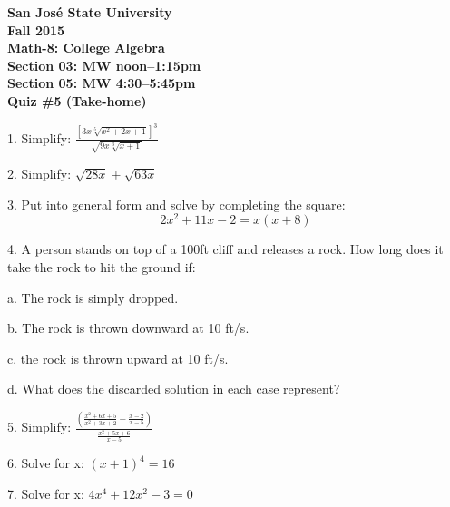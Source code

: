 \documentclass[letterpaper, 12pt]{article}
\begin{document}
\begin{center}
\bfseries
San Jos\'{e} State University \\
Fall 2015 \\
Math-8: College Algebra \\
Section 03: MW noon--1:15pm \\
Section 05: MW 4:30--5:45pm \\
\bigskip
Quiz \#5 (Take-home)
\end{center}

\bigskip

1. Simplify:
    $\frac{\left[3x\sqrt[5]{x^2+2x+1}\right]^3}{\sqrt{9x\sqrt[3]{x+1}}}$

\bigskip

2. Simplify: $\sqrt{28x}+\sqrt{63x}$

\bigskip

3. Put into general form and solve by completing the square:
\[2x^2+11x-2=x(x+8)\]

4. A person stands on top of a 100ft cliff and releases a rock.  How long does
it take the rock to hit the ground if:

\begin{description}
\item{a.} The rock is simply dropped.
\item{b.} The rock is thrown downward at 10 ft/s.
\item{c.} the rock is thrown upward at 10 ft/s.
\item{d.} What does the discarded solution in each case represent?
\end{description}

5. Simplify: $\frac{\left(\frac{x^2+6x+5}{x^2+3x+2}-\frac{x-2}{x-5}\right)}
    {\frac{x^2+5x+6}{x-5}}$

\bigskip

6. Solve for x: $(x+1)^4=16$

\bigskip

7. Solve for x: $4x^4+12x^2-3=0$
\end{document}

